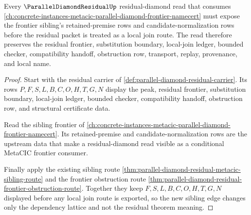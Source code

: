 \begin{theorem}
\label{thm:parallel-diamond-residual-metacic-parallel-frontier-sibling-route}
Every $\ParallelDiamondResidualUp$ residual-diamond read that consumes \autoref{ch:concrete-instances-metacic-parallel-diamond-frontier-namecert} must expose the frontier sibling's retained-premise rows and candidate-normalization rows before the residual packet is treated as a local join route. The read therefore preserves the residual frontier, substitution boundary, local-join ledger, bounded checker, compatibility handoff, obstruction row, transport, replay, provenance, and local name.
\end{theorem}
\begin{proof}
Start with the residual carrier of \autoref{def:parallel-diamond-residual-carrier}. Its rows $P,F,S,L,B,C,O,H,T,G,N$ display the peak, residual frontier, substitution boundary, local-join ledger, bounded checker, compatibility handoff, obstruction row, and structural certificate data.

Read the sibling frontier of \autoref{ch:concrete-instances-metacic-parallel-diamond-frontier-namecert}. Its retained-premise and candidate-normalization rows are the upstream data that make a residual-diamond read visible as a conditional MetaCIC frontier consumer.

Finally apply the existing sibling route \autoref{thm:parallel-diamond-residual-metacic-sibling-route} and the frontier obstruction route \autoref{thm:parallel-diamond-residual-frontier-obstruction-route}. Together they keep $F,S,L,B,C,O,H,T,G,N$ displayed before any local join route is exported, so the new sibling edge changes only the dependency lattice and not the residual theorem meaning.
\end{proof}
